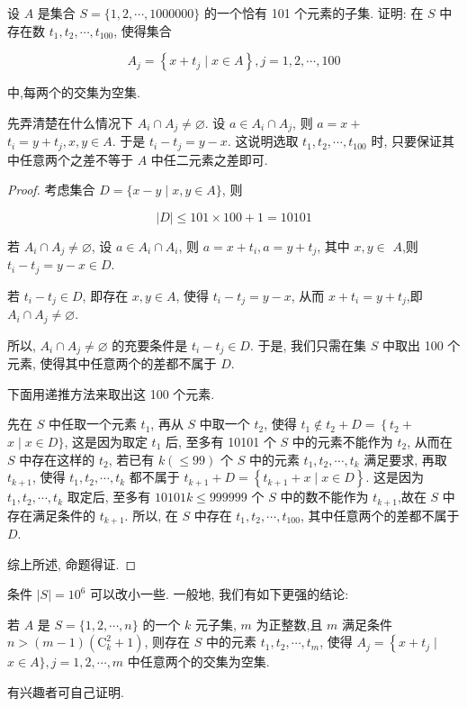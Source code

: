 \begin{example}
	设 $A$ 是集合 $S=\{1,2, \cdots, 1000000\}$ 的一个恰有 101 个元素的子集. 证明: 在 $S$ 中存在数 $t_{1}, t_{2}, \cdots, t_{100}$, 使得集合

	$$
		A_{j}=\left\{x+t_{j} \mid x \in A\right\}, j=1,2, \cdots, 100
	$$

	中,每两个的交集为空集.
\end{example}
\begin{analysis}
	先弄清楚在什么情况下 $A_{i} \cap A_{j} \neq \varnothing$. 设 $a \in A_{i} \cap A_{j}$, 则 $a=x+$ $t_{i}=y+t_{j}, x, y \in A$. 于是 $t_{i}-t_{j}=y-x$. 这说明选取 $t_{1}, t_{2}, \cdots, t_{100}$ 时, 只要保证其中任意两个之差不等于 $A$ 中任二元素之差即可.
\end{analysis}

\begin{proof}
	考虑集合 $D=\{x-y \mid x, y \in A\}$, 则

	$$
		|D| \leqslant 101 \times 100+1=10101
	$$

	若 $A_{i} \cap A_{j} \neq \varnothing$, 设 $a \in A_{i} \cap A_{i}$, 则 $a=x+t_{i}, a=y+t_{j}$, 其中 $x, y \in$ $A$,则 $t_{i}-t_{j}=y-x \in D$.

	若 $t_{i}-t_{j} \in D$, 即存在 $x, y \in A$, 使得 $t_{i}-t_{j}=y-x$, 从而 $x+t_{i}=y+t_{j}$,即 $A_{i} \cap A_{j} \neq \varnothing$.

	所以, $A_{i} \cap A_{j} \neq \varnothing$ 的充要条件是 $t_{i}-t_{j} \in D$. 于是, 我们只需在集 $S$ 中取出 100 个元素, 使得其中任意两个的差都不属于 $D$.

	下面用递推方法来取出这 100 个元素.

	先在 $S$ 中任取一个元素 $t_{1}$, 再从 $S$ 中取一个 $t_{2}$, 使得 $t_{1} \notin t_{2}+D=\left\{t_{2}+\right.$ $x \mid x \in D\}$, 这是因为取定 $t_{1}$ 后, 至多有 10101 个 $S$ 中的元素不能作为 $t_{2}$, 从而在 $S$ 中存在这样的 $t_{2}$, 若已有 $k(\leqslant 99)$ 个 $S$ 中的元素 $t_{1}, t_{2}, \cdots, t_{k}$ 满足要求, 再取 $t_{k+1}$, 使得 $t_{1}, t_{2}, \cdots, t_{k}$ 都不属于 $t_{k+1}+D=\left\{t_{k+1}+x \mid x \in D\right\}$. 这是因为 $t_{1}, t_{2}, \cdots, t_{k}$ 取定后, 至多有 $10101 k \leqslant 999999$ 个 $S$ 中的数不能作为 $t_{k+1}$,故在 $S$ 中存在满足条件的 $t_{k+1}$. 所以, 在 $S$ 中存在 $t_{1}, t_{2}, \cdots, t_{100}$, 其中任意两个的差都不属于 $D$.

	综上所述, 命题得证.
\end{proof}

\begin{note}
	条件 $|S|=10^{6}$ 可以改小一些. 一般地, 我们有如下更强的结论:

	若 $A$ 是 $S=\{1,2, \cdots, n\}$ 的一个 $k$ 元子集, $m$ 为正整数,且 $m$ 满足条件 $n>(m-1)\left(\mathrm{C}_{k}^{2}+1\right)$, 则存在 $S$ 中的元素 $t_{1}, t_{2}, \cdots, t_{m}$, 使得 $A_{j}=\left\{x+t_{j} \mid\right.$ $x \in A\}, j=1,2, \cdots, m$ 中任意两个的交集为空集.

	有兴趣者可自己证明.
\end{note}

